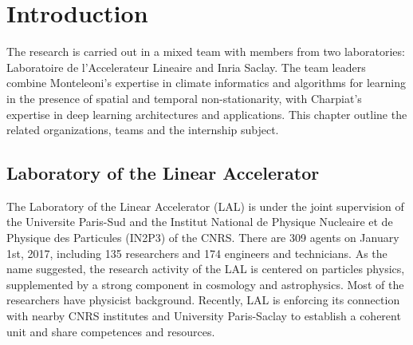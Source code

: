 \chapter{Introduction}
\label{sec:intro}
The research is carried out in a mixed team with members from two laboratories: Laboratoire de l'Accelerateur Lineaire and Inria Saclay. The team leaders combine Monteleoni’s expertise in climate informatics and algorithms for learning in the presence of spatial and temporal non-stationarity, with Charpiat’s expertise in deep learning architectures and applications. This chapter outline the related organizations, teams and the internship subject.

\section{Laboratory of the Linear Accelerator}
\label{sec:laboratory}
The Laboratory of the Linear Accelerator (LAL) is under the joint supervision of the Universite Paris-Sud and the Institut National de Physique Nucleaire et de Physique des Particules (IN2P3) of the CNRS. There are 309 agents on January 1st, 2017, including 135 researchers and 174 engineers and technicians. As the name suggested, the research activity of the LAL is centered on particles physics, supplemented by a strong component in cosmology and astrophysics. Most of the researchers have physicist background. Recently, LAL is enforcing its connection with nearby CNRS institutes and University Paris-Saclay to establish a coherent unit and share competences and resources. 

